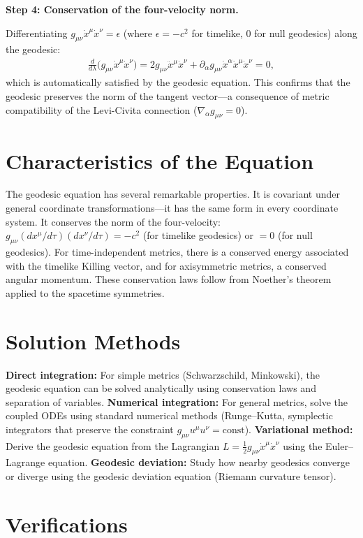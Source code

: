 \documentclass[11pt,openright]{book}
\begin{document}
\textbf{Step 4: Conservation of the four-velocity norm.}

Differentiating $g_{\mu\nu}\dot{x}^\mu\dot{x}^\nu = \epsilon$ (where $\epsilon = -c^2$ for timelike, $0$ for null geodesics) along the geodesic:
\begin{align}
\frac{d}{d\lambda}\bigl(g_{\mu\nu}\dot{x}^\mu\dot{x}^\nu\bigr) = 2g_{\mu\nu}\ddot{x}^\mu\dot{x}^\nu + \partial_\alpha g_{\mu\nu}\dot{x}^\alpha\dot{x}^\mu\dot{x}^\nu = 0,
\end{align}
which is automatically satisfied by the geodesic equation. This confirms that the geodesic preserves the norm of the tangent vector---a consequence of metric compatibility of the Levi-Civita connection ($\nabla_\alpha g_{\mu\nu} = 0$).

\section*{Characteristics of the Equation}

The geodesic equation has several remarkable properties. It is covariant under general coordinate transformations---it has the same form in every coordinate system. It conserves the norm of the four-velocity: $g_{\mu\nu}(dx^\mu/d\tau)(dx^\nu/d\tau) = -c^2$ (for timelike geodesics) or $= 0$ (for null geodesics). For time-independent metrics, there is a conserved energy associated with the timelike Killing vector, and for axisymmetric metrics, a conserved angular momentum. These conservation laws follow from Noether's theorem applied to the spacetime symmetries.
\section*{Solution Methods}

\textbf{Direct integration:} For simple metrics (Schwarzschild, Minkowski), the geodesic equation can be solved analytically using conservation laws and separation of variables. \textbf{Numerical integration:} For general metrics, solve the coupled ODEs using standard numerical methods (Runge--Kutta, symplectic integrators that preserve the constraint $g_{\mu\nu}u^\mu u^\nu = \text{const}$). \textbf{Variational method:} Derive the geodesic equation from the Lagrangian $L = \frac{1}{2}g_{\mu\nu}\dot{x}^\mu\dot{x}^\nu$ using the Euler--Lagrange equation. \textbf{Geodesic deviation:} Study how nearby geodesics converge or diverge using the geodesic deviation equation (Riemann curvature tensor).
\section*{Verifications}
\end{document}

